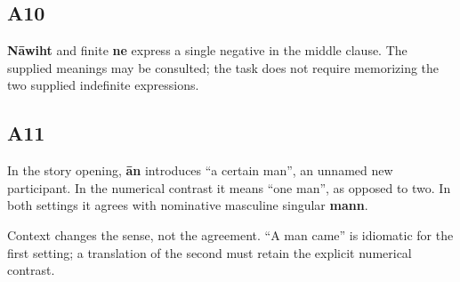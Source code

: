 \subsection*{A10}

\par\begin{minipage}{\linewidth}\raggedright



\textbf{Nāwiht} and finite \textbf{ne} express a single negative in the middle clause. The supplied meanings may be consulted; the task does not require memorizing the two supplied indefinite expressions.

\end{minipage}\par\addvspace{4pt}

\subsection*{A11}

\par\begin{minipage}{\linewidth}\raggedright
In the story opening, \textbf{ān} introduces “a certain man”, an unnamed new participant. In the numerical contrast it means “one man”, as opposed to two. In both settings it agrees with nominative masculine singular \textbf{mann}.

Context changes the sense, not the agreement. “A man came” is idiomatic for the first setting; a translation of the second must retain the explicit numerical contrast.

\end{minipage}\par\addvspace{4pt}

